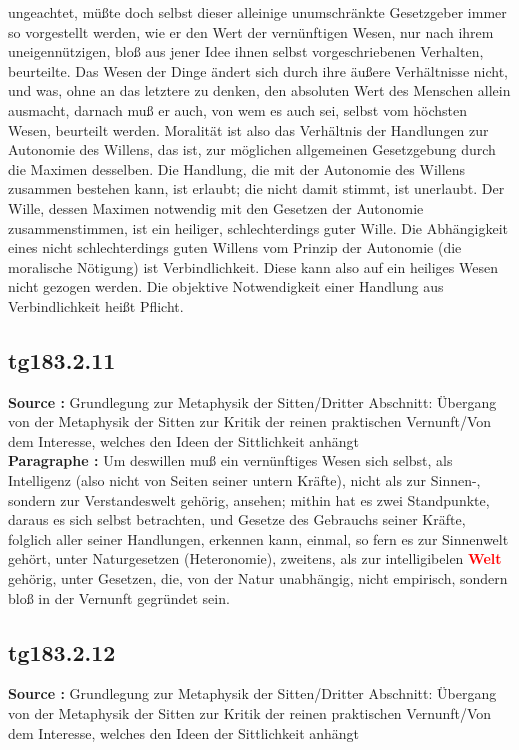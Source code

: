 \documentclass[a4paper,12pt,twoside]{book}
\newcommand{\match}[1]{\textcolor{red}{\textbf{#1}}}
\begin{document}
ungeachtet, müßte doch selbst dieser alleinige unumschränkte Gesetzgeber immer so vorgestellt werden, wie er den Wert der vernünftigen Wesen, nur nach ihrem uneigennützigen, bloß aus jener Idee ihnen selbst vorgeschriebenen Verhalten, beurteilte. Das Wesen der Dinge ändert sich durch ihre äußere Verhältnisse nicht, und was, ohne an das letztere zu denken, den absoluten Wert des Menschen allein ausmacht, darnach muß er auch, von wem es auch sei, selbst vom höchsten Wesen, beurteilt werden. Moralität ist also das Verhältnis der Handlungen zur Autonomie des Willens, das ist, zur möglichen allgemeinen Gesetzgebung durch die  Maximen desselben. Die Handlung, die mit der Autonomie des Willens zusammen bestehen kann, ist erlaubt; die nicht damit stimmt, ist unerlaubt. Der Wille, dessen Maximen notwendig mit den Gesetzen der Autonomie zusammenstimmen, ist ein heiliger, schlechterdings guter Wille. Die Abhängigkeit eines nicht schlechterdings guten Willens vom Prinzip der Autonomie (die moralische Nötigung) ist Verbindlichkeit. Diese kann also auf ein heiliges Wesen nicht gezogen werden. Die objektive Notwendigkeit einer Handlung aus Verbindlichkeit heißt Pflicht. 
	
	\subsection*{tg183.2.11} 
	\textbf{Source : }Grundlegung zur Metaphysik der Sitten/Dritter Abschnitt: Übergang von der Metaphysik der Sitten zur Kritik der reinen praktischen Vernunft/Von dem Interesse, welches den Ideen der Sittlichkeit anhängt\\  
	
	\noindent\textbf{Paragraphe : }Um deswillen muß ein vernünftiges Wesen sich selbst, als Intelligenz (also nicht von Seiten seiner untern Kräfte), nicht als zur Sinnen-, sondern zur Verstandeswelt gehörig, ansehen; mithin hat es zwei Standpunkte, daraus es sich selbst betrachten, und Gesetze des Gebrauchs seiner Kräfte, folglich aller seiner Handlungen, erkennen kann, einmal, so fern es zur Sinnenwelt gehört, unter Naturgesetzen (Heteronomie), zweitens, als zur intelligibelen \match{Welt} gehörig, unter Gesetzen, die, von der Natur unabhängig, nicht empirisch, sondern bloß in der Vernunft gegründet sein. 
	
	\subsection*{tg183.2.12} 
	\textbf{Source : }Grundlegung zur Metaphysik der Sitten/Dritter Abschnitt: Übergang von der Metaphysik der Sitten zur Kritik der reinen praktischen Vernunft/Von dem Interesse, welches den Ideen der Sittlichkeit anhängt\\  
	
\end{document}
